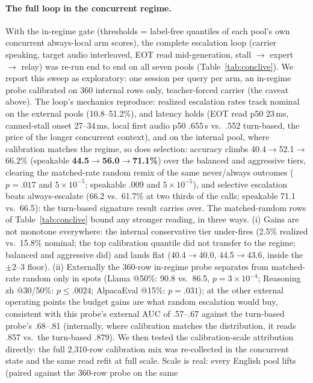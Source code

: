 \paragraph{The full loop in the concurrent regime.} With the
in-regime gate (thresholds = label-free quantiles of each pool's own
concurrent always-local arm scores), the complete escalation loop (carrier
speaking, target audio interleaved, EOT read mid-generation, stall $\to$
expert $\to$ relay) was re-run end to end on all seven pools
(Table~\ref{tab:conclive}). We report this sweep as
exploratory: one session per query per arm, an in-regime probe
calibrated on 360 internal rows only, teacher-forced carrier (the
caveat above). The loop's mechanics reproduce: realized escalation
rates track nominal on the external pools (10.8--51.2\%), and latency
holds (EOT read p50 23\,ms, canned-stall onset 27--34\,ms, local
first audio p50 .655\,s vs.\ .552 turn-based, the price of the longer
concurrent context), and on the internal pool, where calibration
matches the regime, so does selection: accuracy climbs
40.4$\to$52.1$\to$66.2\% (speakable
\textbf{44.5$\to$56.0$\to$71.1\%}) over the balanced and aggressive
tiers, clearing the matched-rate random remix of the same
never/always outcomes ($p{=}.017$ and $5{\times}10^{-5}$; speakable
$.009$ and $5{\times}10^{-5}$), and selective escalation beats
always-escalate (66.2 vs.\ 61.7\% at two thirds of the calls;
speakable 71.1 vs.\ 66.5): the turn-based signature result
carries over. The matched-random rows of Table~\ref{tab:conclive}
bound any stronger reading, in three ways. (i) Gains are not monotone
everywhere: the internal conservative tier under-fires (2.5\%
realized vs.\ 15.8\% nominal; the top calibration quantile did not
transfer to the regime; balanced and aggressive did) and lands flat
(40.4$\to$40.0, 44.5$\to$43.6, inside the $\pm$2--3 floor). (ii)
Externally the 360-row in-regime probe separates from matched-rate
random only in spots (Llama @50\%: 90.8 vs.\ 86.5,
$p{=}3{\times}10^{-4}$; Reasoning zh @30/50\%: $p\le.0024$;
AlpacaEval @15\%: $p{=}.031$); at the other external operating points
the budget gains are what random escalation would buy, consistent
with this probe's external AUC of .57--.67 against the turn-based
probe's .68--.81 (internally, where calibration matches the
distribution, it reads .857 vs.\ the turn-based .879). We then
tested the calibration-scale attribution directly: the full
2{,}310-row calibration mix was re-collected in the concurrent state
and the same read refit at full scale. Scale is real: every
English pool lifts (paired against the 360-row probe on the same

